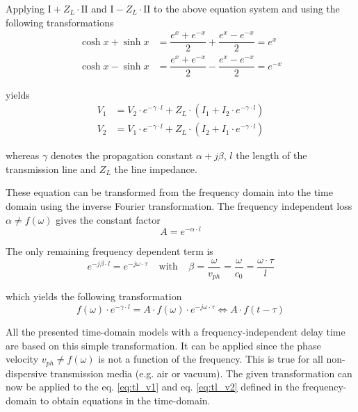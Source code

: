 Applying $\textrm{I} + Z_L\cdot \textrm{II}$ and $\textrm{I} -
Z_L\cdot \textrm{II}$ to the above equation system and using the
following transformations
\begin{align}
\cosh{x} + \sinh{x} &= \dfrac{e^x + e^{-x}}{2} + \dfrac{e^x - e^{-x}}{2} = e^x\\
\cosh{x} - \sinh{x} &= \dfrac{e^x + e^{-x}}{2} - \dfrac{e^x - e^{-x}}{2} = e^{-x}
\end{align}

yields
\begin{align}
\label{eq:tl_v1}
V_1 &= V_2\cdot e^{-\gamma\cdot l} + Z_L\cdot \left(I_1 + I_2\cdot e^{-\gamma\cdot l}\right)\\
\label{eq:tl_v2}
V_2 &= V_1\cdot e^{-\gamma\cdot l} + Z_L\cdot \left(I_2 + I_1\cdot e^{-\gamma\cdot l}\right)
\end{align}

whereas $\gamma$ denotes the propagation constant $\alpha + j\beta$,
$l$ the length of the transmission line and $Z_L$ the line impedance.

\addvspace{12pt}

These equation can be transformed from the frequency domain into the
time domain using the inverse Fourier transformation.  The frequency
independent loss $\alpha \ne f\left(\omega\right)$ gives the constant
factor 
\begin{equation}
A = e^{-\alpha\cdot l}
\end{equation}

The only remaining frequency dependent term is
\begin{equation}
e^{-j\beta\cdot l} = e^{-j\omega\cdot\tau}
\;\;\;\; \textrm{with} \;\;\;\;
\beta = \dfrac{\omega}{v_{ph}} = \dfrac{\omega}{c_0} = \dfrac{\omega\cdot \tau}{l}
\end{equation}

which yields the following transformation
\begin{equation}
f\left(\omega\right)\cdot e^{-\gamma\cdot l} =
A\cdot f\left(\omega\right)\cdot e^{-j\omega\cdot\tau}
\Longleftrightarrow
A\cdot f\left(t - \tau\right)
\end{equation}

All the presented time-domain models with a frequency-independent
delay time are based on this simple transformation.  It can be applied
since the phase velocity $v_{ph} \ne f\left(\omega\right)$ is not a
function of the frequency.  This is true for all non-dispersive
transmission media (e.g. air or vacuum).  The given transformation can
now be applied to the eq. \eqref{eq:tl_v1} and eq. \eqref{eq:tl_v2}
defined in the frequency-domain to obtain equations in the
time-domain.


